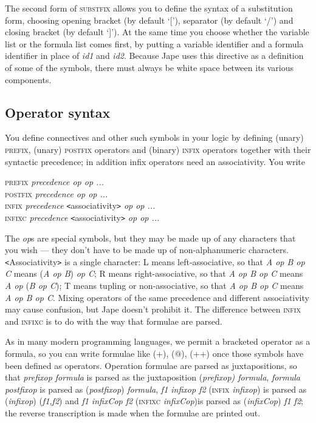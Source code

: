 The second form of \textsc{substfix} allows you to define the syntax of a substitution form, choosing opening bracket (by default `['), separator (by default `/') and closing bracket (by default `]'). At the same time you choose whether the variable list or the formula list comes first, by putting a variable identifier and a formula identifier in place of \textit{id1} and \textit{id2}. Because Jape uses this directive as a definition of some of the symbols, there must always be white space between its various components.

\subsection{Operator syntax}

You define connectives and other such symbols in your logic by defining (unary) \textsc{prefix}, (unary) \textsc{postfix} operators and (binary) \textsc{infix} operators together with their syntactic precedence; in addition infix operators need an associativity. You write

\begin{japeish}
\textsc{prefix} \textit{precedence op op ...}\\
\textsc{postfix} \textit{precedence op op ...}\\
\textsc{infix} \textit{precedence} \texttt{<}associativity\texttt{>} \textit{op op ...}\\
\textsc{infixc} \textit{precedence} \texttt{<}associativity\texttt{>} \textit{op op ...}
\end{japeish}


The \textit{op}s are special symbols, but they may be made up of any characters that you wish --- they don't have to be made up of non-alphanumeric characters. \texttt{<}Associativity\texttt{>} is a single character: L means left-associative, so that \textit{A op B op C} means (\textit{A op B}) \textit{op C}; R means right-associative, so that \textit{A op B op C} means \textit{A op} (\textit{B op C}); T means tupling or non-associative, so that \textit{A op B op C} means \textit{A op B op C}. Mixing operators of the same precedence and different associativity may cause confusion, but Jape doesn't prohibit it. The difference between \textsc{infix} and \textsc{infixc} is to do with the way that formulae are parsed.

As in many modern programming languages, we permit a bracketed operator as a formula, so you can write formulae like (+), (\ensuremath{@}), (++) once those symbols have been defined as operators. Operation formulae are parsed as juxtapositions, so that \textit{prefixop formula} is parsed as the juxtaposition (\textit{prefixop) formula}, \textit{formula postfixop} is parsed as (\textit{postfixop}) \textit{formula}, \textit{f1 infixop f2} (\textsc{infix} \textit{infixop}) is parsed as (\textit{infixop}) (\textit{f1,f2}) and \textit{f1 infixCop f2} (\textsc{infixc} \textit{infixCop})is parsed as (\textit{infixCop}) \textit{f1 f2}; the reverse transcription is made when the formulae are printed out.

